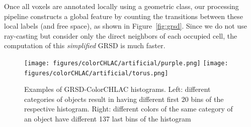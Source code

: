 \documentclass[conference]{sty/IEEEtran}
\begin{document}
Once all voxels are annotated locally using a geometric class, our
processing pipeline constructs a global feature by counting the transitions
between these local labels (and free space), as shown in Figure~\ref{fig:grsd}.
Since we do not use ray-casting but consider only the direct neighbors
of each occupied cell, the computation of this \emph{simplified} GRSD is much faster.

\begin{figure}[htb!]
  \begin{center}
    \texttt{[image: figures/colorCHLAC/artificial/purple.png]}
    \texttt{[image: figures/colorCHLAC/artificial/torus.png]}
    \caption{Examples of GRSD-ColorCHLAC histograms. Left: different categories
of objects result in having different first 20 bins of the respective histogram.
Right: different colors of the same category of an object have different 137 last bins
of the histogram}
    \label{fig:grsd_cchlac}
  \end{center}
\end{figure}
\end{document}
